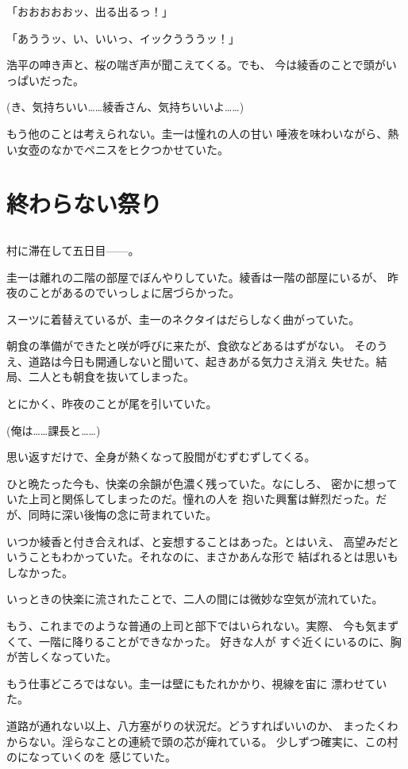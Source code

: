 ﻿\documentclass[
    book,tate,
    line_length=30zw,
    jafontsize=12pt,
    paper=b5j,
    landscape,
    ]{jlreq}
\begin{document}
「おおおおおッ、出る出るっ！」

「あううッ、い、いいっ、イックうううッ！」

浩平の呻き声と、桜の喘ぎ声が聞こえてくる。でも、
今は綾香のことで頭がいっぱいだった。

(き、気持ちいい……綾香さん、気持ちいいよ……)

もう他のことは考えられない。圭一は憧れの人の甘い
唾液を味わいながら、熱い女壺のなかでペニスをヒクつかせていた。

\chapter{終わらない祭り}

\section*{}

村に滞在して五日目------。

圭一は離れの二階の部屋でぼんやりしていた。綾香は一階の部屋にいるが、
昨夜のことがあるのでいっしょに居づらかった。

スーツに着替えているが、圭一のネクタイはだらしなく曲がっていた。

朝食の準備ができたと咲が呼びに来たが、食欲などあるはずがない。
そのうえ、道路は今日も開通しないと聞いて、起きあがる気力さえ消え
失せた。結局、二人とも朝食を抜いてしまった。

とにかく、昨夜のことが尾を引いていた。

(俺は……課長と……)

思い返すだけで、全身が熱くなって股間がむずむずしてくる。

ひと晩たった今も、快楽の余韻が色濃く残っていた。なにしろ、
密かに想っていた上司と関係してしまったのだ。憧れの人を
抱いた興奮は鮮烈だった。だが、同時に深い後悔の念に苛まれていた。

いつか綾香と付き合えれば、と妄想することはあった。とはいえ、
高望みだということもわかっていた。それなのに、まさかあんな形で
結ばれるとは思いもしなかった。

いっときの快楽に流されたことで、二人の間には微妙な空気が流れていた。

もう、これまでのような普通の上司と部下ではいられない。実際、
今も気まずくて、一階に降りることができなかった。 好きな人が
すぐ近くにいるのに、胸が苦しくなっていた。

もう仕事どころではない。圭一は壁にもたれかかり、視線を宙に
漂わせていた。

道路が通れない以上、八方塞がりの状況だ。どうすればいいのか、
まったくわからない。淫らなことの連続で頭の芯が痺れている。
少しずつ確実に、この村のになっていくのを
感じていた。
\end{document}
